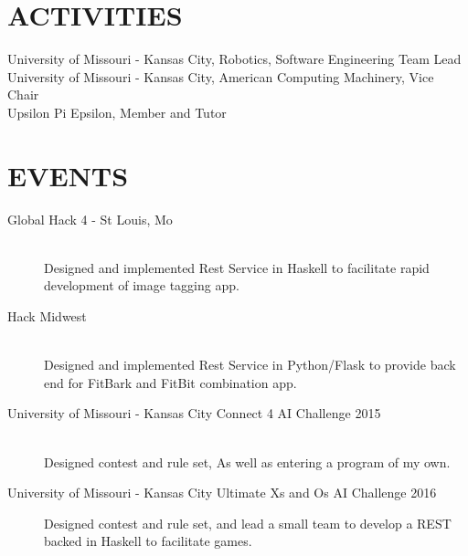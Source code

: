 \documentclass[margin,11pt]{res} %
\begin{document}
\begin{resume}
 
\section{ACTIVITIES}
University of Missouri - Kansas City, Robotics, Software Engineering Team Lead \\
University of Missouri - Kansas City, American Computing Machinery, Vice Chair \\
Upsilon Pi Epsilon, Member and Tutor		
\section{EVENTS}
\begin{description}
\item [Global Hack 4 - St Louis, Mo] \hfill \\
   Designed and implemented Rest Service in Haskell to facilitate rapid development of image tagging app.

\item [Hack Midwest] \hfill \\
  Designed and implemented Rest Service in Python/Flask to provide back end for FitBark and FitBit combination app.

\item[University of Missouri - Kansas City Connect 4 AI Challenge 2015] \hfil \\ 
	Designed contest and rule set, As well as entering a program of my own.
\item[University of Missouri - Kansas City Ultimate Xs and Os AI Challenge 2016]
	Designed contest and rule set, and lead a small team to develop a REST backed in Haskell to facilitate games.  

\end{description}
\end{resume} 
\end{document}
